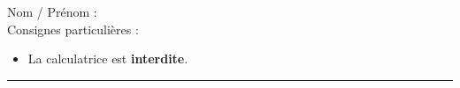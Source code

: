 \newpage

\setcounter{Exercise}{0}

\pagestyle{fancy}
\fancyhead[R]{\today}

\reversemarginpar

\null\vspace{-30pt}
Nom / Prénom : \\

Consignes particulières : 
\begin{itemize}[label=$\bullet$]
	\item 
	La calculatrice est \textbf{interdite}.
\end{itemize}

\hrule

